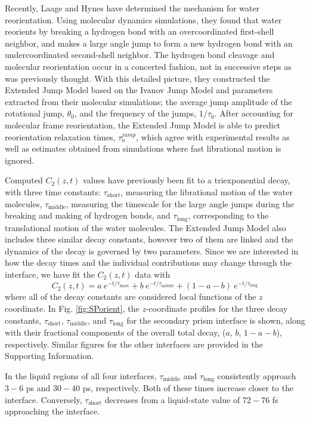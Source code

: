 Recently, Laage and Hynes have determined the mechanism for water
reorientation.\cite{Laage2006,Laage2008} Using molecular dynamics
simulations, they found that water reorients by breaking a hydrogen
bond with an overcoordinated first-shell neighbor, and makes a large
angle jump to form a new hydrogen bond with an undercoordinated
second-shell neighbor. The hydrogen bond cleavage and molecular
reorientation occur in a concerted fashion, not in successive steps as
was previously thought. With this detailed picture, they constructed
the Extended Jump Model\cite{Laage2006,Laage2008} based on the Ivanov
Jump Model and parameters extracted from their molecular simulations;
the average jump amplitude of the rotational jump, $\theta_{0}$, and
the frequency of the jumps, $1/\tau_{0}$. After accounting for
molecular frame reorientation, the Extended Jump Model is able to
predict reorientation relaxation times, $\tau_{n}^{jump}$, which agree
with experimental results as well as estimates obtained from
simulations where fast librational motion is ignored.

Computed $C_2(z,t)$ values have previously been fit to a
triexponential decay, with three time constants:
$\tau_\mathrm{short}$, measuring the librational motion of the water
molecules, $\tau_\mathrm{middle}$, measuring the timescale for the
large angle jumps during the breaking and making of hydrogen bonds,
and $\tau_\mathrm{long}$, corresponding to the translational motion of
the water molecules.\cite{Louden2013a} The Extended Jump Model also
includes three similar decay constants, however two of them are linked
and the dynamics of the decay is governed by two parameters. Since we
are interested in how the decay times and the individual contributions
may change through the interface, we have fit the $C_2(z,t)$ data
with
\begin{equation}
  C_{2}(z,t) = a~e^{-t/\tau_\mathrm{short}} + b~e^{-t/\tau_\mathrm{middle}} + 
  (1-a-b)~e^{-t/\tau_\mathrm{long}}
\label{eq:c2}
\end{equation}
where all of the decay constants are considered local functions of the
$z$ coordinate. In Fig. \ref{fig:SPorient}, the $z$-coordinate
profiles for the three decay constants, $\tau_{\mathrm{short}}$,
$\tau_{\mathrm{middle}}$, and $\tau_{\mathrm{long}}$ for the secondary prism interface
is shown, along with their fractional components of the overall total
decay, ($a$, $b$, $1-a-b$), respectively. Similar figures for the
other interfaces are provided in the Supporting Information.

In the liquid regions of all four interfaces, $\tau_\mathrm{middle}$
and $\tau_\mathrm{long}$ consistently approach $3-6$ ps and $30-40$
ps, respectively.  Both of these times increase closer to the
interface.  Conversely, $\tau_\mathrm{short}$ decreases from a
liquid-state value of $72-76$ fs approaching the interface.

